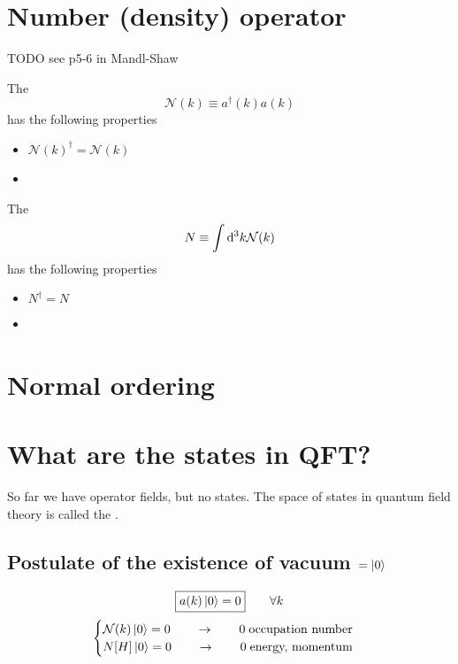 \section{Number (density) operator}
TODO see p5-6 in Mandl-Shaw

The 
\[ \mathcal{N}(k) \equiv a^\dagger(k)a(k)\]
has the following properties

\begin{eigenschap}
\begin{itemize}
\item  $\mathcal{N}(k)^\dagger = \mathcal{N}(k)$
\item {}
\end{itemize}
\end{eigenschap}


The 
\[ N \equiv \int \operatorname{d \!}{^3k}\mathcal{N}(k)\]
has the following properties
\begin{eigenschap}
\begin{itemize}
\item  $N^\dagger = N$
\item \raisebox{-0.95em}{$\begin{aligned}
&[N, a(p)] = -a(p) \\
&[N, a^\dagger(p)] = +a(p)
\end{aligned}$}
\end{itemize}
\end{eigenschap}

\section{Normal ordering}

\section{What are the states in QFT?}
So far we have operator fields, but no states. The space of states in quantum field theory is called the .
\subsection{Postulate of the existence of vacuum $=\left| 0 \right\rangle$}
\[ \boxed{a(k)\left| 0 \right\rangle=0} \qquad \forall k \]
\[ \begin{cases}
\mathcal{N}(k)\left| 0 \right\rangle = 0 \qquad \to \qquad 0\; \text{occupation number} \\
N[H]\left| 0 \right\rangle = 0 \qquad \to \qquad 0\; \text{energy, momentum}
\end{cases} \]

